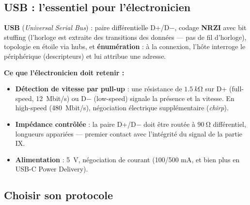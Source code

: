 \documentclass[12pt,a4paper,twoside]{book}
\begin{document}
\subsection{USB : l'essentiel pour l'électronicien}

\begin{formule}
\textbf{USB} (\textit{Universal Serial Bus}) : paire différentielle D+/D$-$, codage \textbf{NRZI} avec bit stuffing (l'horloge est extraite des transitions des données --- pas de fil d'horloge), topologie en étoile via hubs, et \textbf{énumération} : à la connexion, l'hôte interroge le périphérique (descripteurs) et lui attribue une adresse.

\textbf{Ce que l'électronicien doit retenir :}
\begin{itemize}[nosep]
\item \textbf{Détection de vitesse par pull-up} : une résistance de $\SI{1.5}{k\ohm}$ sur D+ (full-speed, \SI{12}{Mbit/s}) ou D$-$ (low-speed) signale la présence et la vitesse. En high-speed (\SI{480}{Mbit/s}), négociation électrique supplémentaire (\textit{chirp}).
\item \textbf{Impédance contrôlée} : la paire D+/D$-$ doit être routée à $\SI{90}{\ohm}$ différentiel, longueurs appariées --- premier contact avec l'intégrité du signal de la partie IX.
\item \textbf{Alimentation} : \SI{5}{V}, négociation de courant (100/500 mA, et bien plus en USB-C Power Delivery).
\end{itemize}
\end{formule}

\subsection{Choisir son protocole}
\end{document}
